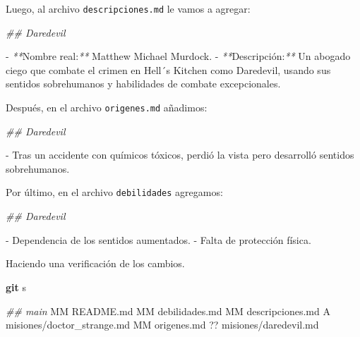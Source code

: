 \documentclass[
]{book}
\newenvironment{Shaded}{\begin{snugshade}}{\end{snugshade}}
\newcommand{\CommentTok}[1]{\textcolor[rgb]{0.56,0.35,0.01}{\textit{#1}}}
\newcommand{\ExtensionTok}[1]{#1}
\newcommand{\FunctionTok}[1]{\textcolor[rgb]{0.13,0.29,0.53}{\textbf{#1}}}
\newcommand{\NormalTok}[1]{#1}
\newcommand{\PreprocessorTok}[1]{\textcolor[rgb]{0.56,0.35,0.01}{\textit{#1}}}
\begin{document}
Luego, al archivo \texttt{descripciones.md} le vamos a agregar:

\begin{Shaded}
\begin{Highlighting}[]

\CommentTok{\#\# Daredevil}

\ExtensionTok{{-}} \PreprocessorTok{**}\NormalTok{Nombre real:}\PreprocessorTok{**}\NormalTok{ Matthew Michael Murdock.  }
\ExtensionTok{{-}} \PreprocessorTok{**}\NormalTok{Descripción:}\PreprocessorTok{**}\NormalTok{ Un abogado ciego que combate el crimen en Hell´s Kitchen como Daredevil, usando sus sentidos sobrehumanos y habilidades de combate excepcionales.}
\end{Highlighting}
\end{Shaded}

Después, en el archivo \texttt{origenes.md} añadimos:

\begin{Shaded}
\begin{Highlighting}[]

\CommentTok{\#\# Daredevil}

\ExtensionTok{{-}}\NormalTok{ Tras un accidente con químicos tóxicos, perdió la vista pero desarrolló sentidos sobrehumanos.}
\end{Highlighting}
\end{Shaded}

Por último, en el archivo \texttt{debilidades} agregamos:

\begin{Shaded}
\begin{Highlighting}[]

\CommentTok{\#\# Daredevil}

\ExtensionTok{{-}}\NormalTok{ Dependencia de los sentidos aumentados.}
\ExtensionTok{{-}}\NormalTok{ Falta de protección física.}
\end{Highlighting}
\end{Shaded}

Haciendo una verificación de los cambios.

\begin{Shaded}
\begin{Highlighting}[]
\FunctionTok{git}\NormalTok{ s}
\end{Highlighting}
\end{Shaded}

\begin{Shaded}
\begin{Highlighting}[]
\CommentTok{\#\# main}
\ExtensionTok{MM}\NormalTok{ README.md}
\ExtensionTok{MM}\NormalTok{ debilidades.md}
\ExtensionTok{MM}\NormalTok{ descripciones.md}
\ExtensionTok{A}\NormalTok{  misiones/doctor\_strange.md}
\ExtensionTok{MM}\NormalTok{ origenes.md}
\ExtensionTok{??}\NormalTok{ misiones/daredevil.md}
\end{Highlighting}
\end{Shaded}
\end{document}
